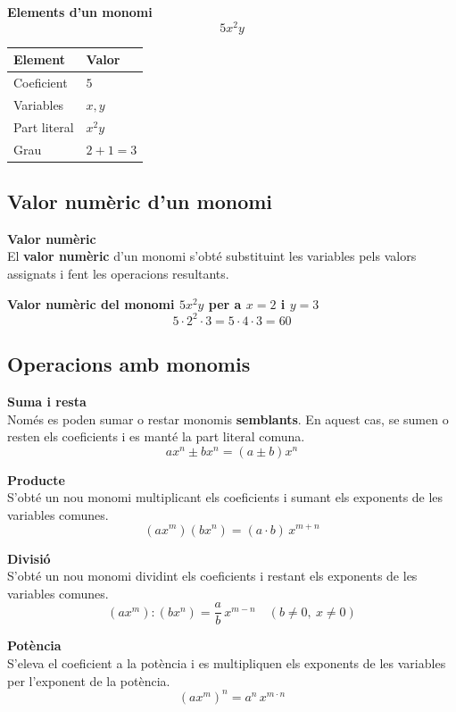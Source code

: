 \documentclass[12pt]{article}
\begin{document}
\begin{exemple}
\textbf{Elements d'un monomi}
\[
5x^2 y
\]
\begin{center}
\small
\begin{tabular}{ll}
\toprule
\textbf{Element} & \textbf{Valor} \\
\midrule
Coeficient & $5$ \\
Variables & $x, y$ \\
Part literal & $x^2 y$ \\
Grau & $2+1 = 3$ \\
\bottomrule
\end{tabular}
\end{center}
\end{exemple}

\subsection{Valor numèric d'un monomi}

\begin{concept}
\textbf{Valor numèric}\\
El \textbf{valor numèric} d'un monomi s'obté substituint les variables pels valors assignats i fent les operacions resultants.
\end{concept}

\begin{exemple}
\textbf{Valor numèric del monomi $5x^2 y$ per a $x=2$ i $y=3$}
\[
5 \cdot 2^2 \cdot 3 = 5 \cdot 4 \cdot 3 = 60
\]
\end{exemple}

\subsection{Operacions amb monomis}

\begin{concept}
\textbf{Suma i resta}\\
Només es poden sumar o restar monomis \textbf{semblants}. En aquest cas, se sumen o resten els coeficients i es manté la part literal comuna.
\[
a x^n \pm b x^n = (a \pm b) x^n
\]

\textbf{Producte}\\
S'obté un nou monomi multiplicant els coeficients i sumant els exponents de les variables comunes.
\[
(a x^m)(b x^n) = (a \cdot b) \, x^{m+n}
\]

\textbf{Divisió}\\
S'obté un nou monomi dividint els coeficients i restant els exponents de les variables comunes.
\[
(a x^m) : (b x^n) = \dfrac{a}{b} \, x^{m-n} \quad (b \neq 0, \ x \neq 0)
\]

\textbf{Potència}\\
S'eleva el coeficient a la potència i es multipliquen els exponents de les variables per l'exponent de la potència.
\[
(a x^m)^n = a^n \, x^{m \cdot n}
\]
\end{concept}
\end{document}
